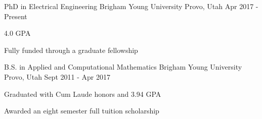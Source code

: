 

\begin{cventries}

  \cventry
    {PhD in Electrical Engineering} %
    {Brigham Young University} %
    {Provo, Utah} %
    {Apr 2017 - Present} %
    {
      \begin{cvitems}
        \item {4.0 GPA}
        \item {Fully funded through a graduate fellowship}
      \end{cvitems}
    }

  \cventry
    {B.S. in Applied and Computational Mathematics} %
    {Brigham Young University} %
    {Provo, Utah} %
    {Sept 2011 - Apr 2017} %
    {
      \begin{cvitems} %
        \item {Graduated with Cum Laude honors and 3.94 GPA}
        \item {Awarded an eight semester full tuition scholarship}
      \end{cvitems}
    }

\end{cventries}
